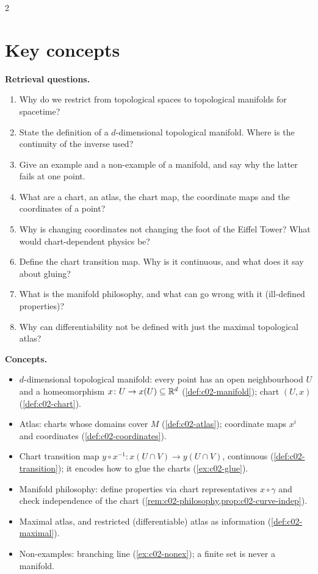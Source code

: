 \begin{paracol}{2}
\section*{Key concepts}
\begin{keyconcepts}
\textbf{Retrieval questions.}
\begin{enumerate}
  \item Why do we restrict from topological spaces to topological manifolds for spacetime?
  \item State the definition of a $d$-dimensional topological manifold. Where is the continuity of the inverse used?
  \item Give an example and a non-example of a manifold, and say why the latter fails at one point.
  \item What are a chart, an atlas, the chart map, the coordinate maps and the coordinates of a point?
  \item Why is changing coordinates not changing the foot of the Eiffel Tower? What would chart-dependent physics be?
  \item Define the chart transition map. Why is it continuous, and what does it say about gluing?
  \item What is the manifold philosophy, and what can go wrong with it (ill-defined properties)?
  \item Why can differentiability not be defined with just the maximal topological atlas?
\end{enumerate}
\textbf{Concepts.}
\begin{itemize}
  \item $d$-dimensional topological manifold: every point has an open neighbourhood $U$ and a homeomorphism $x\colon U\to x(U)\subseteq\mathbb{R}^d$ (\cref{def:c02-manifold}); chart $(U,x)$ (\cref{def:c02-chart}).
  \item Atlas: charts whose domains cover $M$ (\cref{def:c02-atlas}); coordinate maps $x^i$ and coordinates (\cref{def:c02-coordinates}).
  \item Chart transition map $y\circ x^{-1}\colon x(U\cap V)\to y(U\cap V)$, continuous (\cref{def:c02-transition}); it encodes how to glue the charts (\cref{ex:c02-glue}).
  \item Manifold philosophy: define properties via chart representatives $x\circ\gamma$ and check independence of the chart (\cref{rem:c02-philosophy,prop:c02-curve-indep}).
  \item Maximal atlas, and restricted (differentiable) atlas as information (\cref{def:c02-maximal}).
  \item Non-examples: branching line (\cref{ex:c02-nonex}); a finite set is never a manifold.
\end{itemize}
\end{keyconcepts}

\flushside
\end{paracol}
